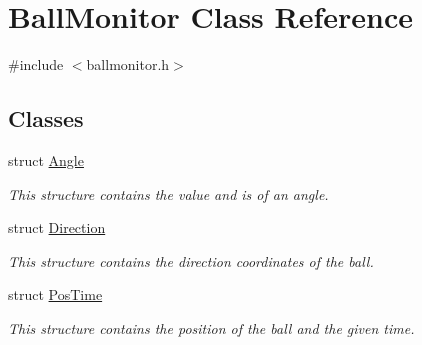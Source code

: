 \hypertarget{classBallMonitor}{
\section{BallMonitor Class Reference}
\label{classBallMonitor}
}


{\ttfamily \#include $<$ballmonitor.h$>$}

\subsection*{Classes}
\begin{DoxyCompactItemize}
\item 
struct \hyperlink{structBallMonitor_1_1Angle}{Angle}
\begin{DoxyCompactList}\small\item\em This structure contains the value and is of an angle. \item\end{DoxyCompactList}\item 
struct \hyperlink{structBallMonitor_1_1Direction}{Direction}
\begin{DoxyCompactList}\small\item\em This structure contains the direction coordinates of the ball. \item\end{DoxyCompactList}\item 
struct \hyperlink{structBallMonitor_1_1PosTime}{PosTime}
\begin{DoxyCompactList}\small\item\em This structure contains the position of the ball and the given time. \item\end{DoxyCompactList}\end{DoxyCompactItemize}
